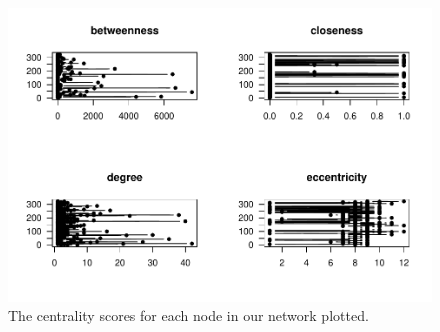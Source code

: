 \documentclass[
  man,floatsintext]{apa6}
\begin{document}
\begin{figure}[H]
\includegraphics{SNA4DS_Report_files/figure-latex/centralities-plot-1} \caption{The centrality scores for each node in our network plotted.}\label{fig:centralities-plot}
\end{figure}
\end{document}
